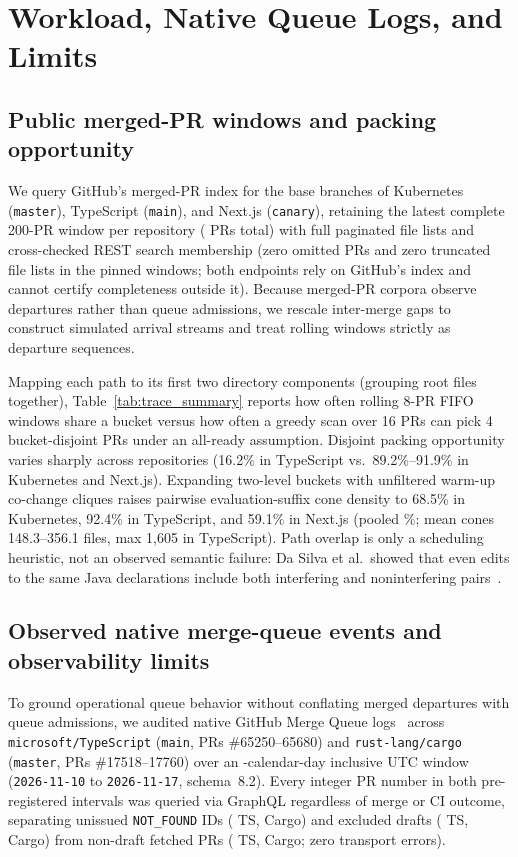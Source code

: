 \section{Workload, Native Queue Logs, and Limits}
\label{sec:background}
\subsection{Public merged-PR windows and packing opportunity}
We query GitHub's merged-PR index for the base branches of Kubernetes (\texttt{master}), TypeScript (\texttt{main}), and Next.js (\texttt{canary}), retaining the latest complete 200-PR window per repository (\TraceCount{} PRs total) with full paginated file lists and cross-checked REST search membership (zero omitted PRs and zero truncated file lists in the pinned windows; both endpoints rely on GitHub's index and cannot certify completeness outside it). Because merged-PR corpora observe departures rather than queue admissions, we rescale inter-merge gaps to construct simulated arrival streams and treat rolling windows strictly as departure sequences.

Mapping each path to its first two directory components (grouping root files together), Table~\ref{tab:trace_summary} reports how often rolling 8-PR FIFO windows share a bucket versus how often a greedy scan over 16 PRs can pick 4 bucket-disjoint PRs under an all-ready assumption. Disjoint packing opportunity varies sharply across repositories (16.2\% in TypeScript vs.\ 89.2\%--91.9\% in Kubernetes and Next.js). Expanding two-level buckets with unfiltered warm-up co-change cliques raises pairwise evaluation-suffix cone density to 68.5\% in Kubernetes, 92.4\% in TypeScript, and 59.1\% in Next.js (pooled \UnfDensity{}\%; mean cones 148.3--356.1 files, max 1,605 in TypeScript). Path overlap is only a scheduling heuristic, not an observed semantic failure: Da Silva et al.\ showed that even edits to the same Java declarations include both interfering and noninterfering pairs~\cite{dasilva2024semantic}.



\subsection{Observed native merge-queue events and observability limits}
To ground operational queue behavior without conflating merged departures with queue admissions, we audited native GitHub Merge Queue logs~\cite{github2026mergequeue} across \texttt{microsoft/TypeScript} (\texttt{main}, PRs \#65250--65680) and \texttt{rust-lang/cargo} (\texttt{master}, PRs \#17518--17760) over an \ObsDays{}-calendar-day inclusive UTC window (\texttt{2026-11-10} to \texttt{2026-11-17}, schema~8.2). Every integer PR number in both pre-registered intervals was queried via GraphQL regardless of merge or CI outcome, separating unissued \texttt{NOT\_FOUND} IDs (\ObsTsNotFound{} TS, \ObsCargoNotFound{} Cargo) and excluded drafts (\ObsTsDrafts{} TS, \ObsCargoDrafts{} Cargo) from non-draft fetched PRs (\ObsTsFetched{} TS, \ObsCargoFetched{} Cargo; zero transport errors).

